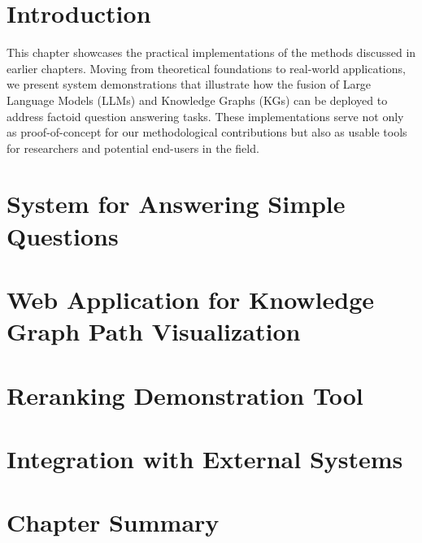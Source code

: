 \section{Introduction}
\label{sec:demo:intro}
This chapter showcases the practical implementations of the methods discussed in earlier chapters. Moving from theoretical foundations to real-world applications, we present system demonstrations that illustrate how the fusion of Large Language Models (LLMs) and Knowledge Graphs (KGs) can be deployed to address factoid question answering tasks. These implementations serve not only as proof-of-concept for our methodological contributions but also as usable tools for researchers and potential end-users in the field.

\section{System for Answering Simple Questions}
\label{sec:demo:simple_qa}

\section{Web Application for Knowledge Graph Path Visualization}
\label{sec:demo:kg_path_viz}

\section{Reranking Demonstration Tool}
\label{sec:demo:reranking}

\section{Integration with External Systems}
\label{sec:demo:integration}

\section{Chapter Summary}
\label{sec:demo:summary}
